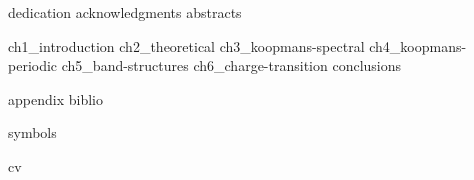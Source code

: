 \documentclass[a4paper,11pt]{book}
\begin{document}
\setlength{\parindent}{0pt}
\frontmatter


\setlength{\parskip}{0.5em}

{dedication}
\setcounter{page}{0}
{acknowledgments}
{abstracts}

\setlength{\parskip}{0pt}

\cleardoublepage
{}
{\hypersetup{hidelinks} \tableofcontents}

\cleardoublepage
{}
{}
{\hypersetup{hidelinks} \listoffigures}
 
\cleardoublepage
{}
{}
{\hypersetup{hidelinks} \listoftables}

\setlength{\parskip}{1em}


\mainmatter
%
{ch1_introduction}
\cleardoublepage
%
{ch2_theoretical}
\cleardoublepage
%
{ch3_koopmans-spectral}
\cleardoublepage
%
{ch4_koopmans-periodic}
\cleardoublepage
%
{ch5_band-structures}
\cleardoublepage
%
{ch6_charge-transition}
\cleardoublepage
%
{conclusions}
\cleardoublepage

\cleardoublepage
{}


{appendix}
\backmatter
{biblio}

\cleardoublepage
{}
{symbols}

{cv}
\end{document}

